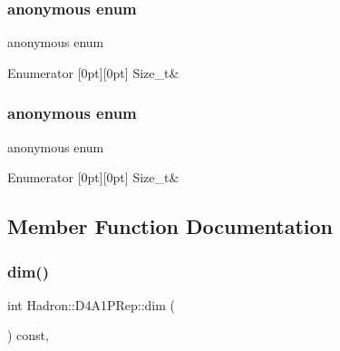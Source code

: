 \subsubsection{\texorpdfstring{anonymous enum}{anonymous enum}}
{\footnotesize\ttfamily anonymous enum}

\begin{DoxyEnumFields}{Enumerator}
[0pt][0pt]{}\mbox{\label{structHadron_1_1D4A1PRep_a9508897f9610196a34fdc58eb1d5c143a6299c4e0810e50605d6dc6751f7f7bab}} 
Size\+\_\+t&\\
\hline

\end{DoxyEnumFields}
\mbox{\label{structHadron_1_1D4A1PRep_a9508897f9610196a34fdc58eb1d5c143}} 
\subsubsection{\texorpdfstring{anonymous enum}{anonymous enum}}
{\footnotesize\ttfamily anonymous enum}

\begin{DoxyEnumFields}{Enumerator}
[0pt][0pt]{}\mbox{\label{structHadron_1_1D4A1PRep_a9508897f9610196a34fdc58eb1d5c143a6299c4e0810e50605d6dc6751f7f7bab}} 
Size\+\_\+t&\\
\hline

\end{DoxyEnumFields}


\subsection{Member Function Documentation}
\mbox{\label{structHadron_1_1D4A1PRep_a3b84dbb23476d76b192c0440aafb9e92}} 
\subsubsection{\texorpdfstring{dim()}{dim()}\hspace{0.1cm}{\footnotesize\ttfamily [1/2]}}
{\footnotesize\ttfamily int Hadron\+::\+D4\+A1\+P\+Rep\+::dim (\begin{DoxyParamCaption}{ }\end{DoxyParamCaption}) const\hspace{0.3cm}{\ttfamily [inline]}, {\ttfamily [virtual]}}

